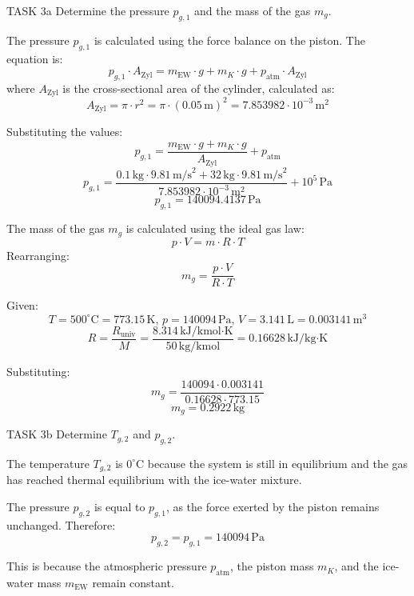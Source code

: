 TASK 3a  
Determine the pressure \( p_{g,1} \) and the mass of the gas \( m_g \).

The pressure \( p_{g,1} \) is calculated using the force balance on the piston. The equation is:  
\[
p_{g,1} \cdot A_{\text{Zyl}} = m_{\text{EW}} \cdot g + m_K \cdot g + p_{\text{atm}} \cdot A_{\text{Zyl}}
\]  
where \( A_{\text{Zyl}} \) is the cross-sectional area of the cylinder, calculated as:  
\[
A_{\text{Zyl}} = \pi \cdot r^2 = \pi \cdot (0.05 \, \text{m})^2 = 7.853982 \cdot 10^{-3} \, \text{m}^2
\]  

Substituting the values:  
\[
p_{g,1} = \frac{m_{\text{EW}} \cdot g + m_K \cdot g}{A_{\text{Zyl}}} + p_{\text{atm}}
\]  
\[
p_{g,1} = \frac{0.1 \, \text{kg} \cdot 9.81 \, \text{m/s}^2 + 32 \, \text{kg} \cdot 9.81 \, \text{m/s}^2}{7.853982 \cdot 10^{-3} \, \text{m}^2} + 10^5 \, \text{Pa}
\]  
\[
p_{g,1} = 140094.4137 \, \text{Pa}
\]  

The mass of the gas \( m_g \) is calculated using the ideal gas law:  
\[
p \cdot V = m \cdot R \cdot T
\]  
Rearranging:  
\[
m_g = \frac{p \cdot V}{R \cdot T}
\]  

Given:  
\[
T = 500^\circ\text{C} = 773.15 \, \text{K}, \, p = 140094 \, \text{Pa}, \, V = 3.141 \, \text{L} = 0.003141 \, \text{m}^3
\]  
\[
R = \frac{R_{\text{univ}}}{M} = \frac{8.314 \, \text{kJ/kmol·K}}{50 \, \text{kg/kmol}} = 0.16628 \, \text{kJ/kg·K}
\]  

Substituting:  
\[
m_g = \frac{140094 \cdot 0.003141}{0.16628 \cdot 773.15}
\]  
\[
m_g = 0.2922 \, \text{kg}
\]  

TASK 3b  
Determine \( T_{g,2} \) and \( p_{g,2} \).

The temperature \( T_{g,2} \) is \( 0^\circ\text{C} \) because the system is still in equilibrium and the gas has reached thermal equilibrium with the ice-water mixture.  

The pressure \( p_{g,2} \) is equal to \( p_{g,1} \), as the force exerted by the piston remains unchanged. Therefore:  
\[
p_{g,2} = p_{g,1} = 140094 \, \text{Pa}
\]  

This is because the atmospheric pressure \( p_{\text{atm}} \), the piston mass \( m_K \), and the ice-water mass \( m_{\text{EW}} \) remain constant.